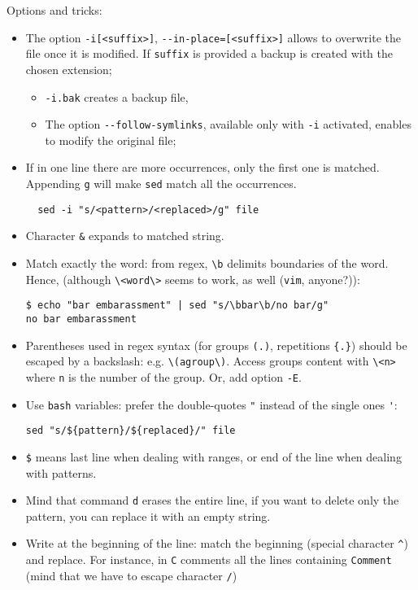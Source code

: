 \documentclass[a4paper,12pt,%
              final%
              ]{article}
\begin{document}
Options and tricks:
\begin{itemize}
  \item The option \verb|-i[<suffix>]|, \verb|--in-place=[<suffix>]| allows to overwrite the file once it is modified. If \verb|suffix| is provided a backup is created with the chosen extension;
    \begin{itemize}
      \item \verb|-i.bak| creates a backup file,
      \item The option \verb|--follow-symlinks|, available only with \verb|-i| activated, enables to modify the original file;
    \end{itemize}
  \item If in one line there are more occurrences, only the first one is matched. Appending \texttt{g} will make \texttt{sed} match all the occurrences.
\begin{verbatim}
  sed -i "s/<pattern>/<replaced>/g" file
\end{verbatim}
  \item Character \verb|&| expands to matched string.
  \item Match exactly the word: from regex, \verb|\b| delimits boundaries of the word. Hence, (although \verb|\<word\>| seems to work, as well (\texttt{vim}, anyone?)):
\begin{verbatim}
$ echo "bar embarassment" | sed "s/\bbar\b/no bar/g"
no bar embarassment
\end{verbatim}
  \item Parentheses used in regex syntax (for groups \verb|(.)|, repetitions \verb|{.}|) should be escaped by a backslash: e.g. \verb|\(agroup\)|. Access groups content with \verb|\<n>| where \verb|n| is the number of the group. Or, add option \verb|-E|.
  \item Use \texttt{bash} variables: prefer the double-quotes \verb|"| instead of the single ones \verb|'|:
\begin{verbatim}
sed "s/${pattern}/${replaced}/" file
\end{verbatim}
  \item \verb|$| means last line when dealing with ranges, or end of the line when dealing with patterns.
  \item Mind that command \verb|d| erases the entire line, if you want to delete only the pattern, you can replace it with an empty string.
  \item Write at the beginning of the line: match the beginning (special character \verb|^|) and replace. For instance, in \texttt{C} comments all the lines containing \texttt{Comment} (mind that we have to escape character \verb|/|)

\end{itemize}
\end{document}
